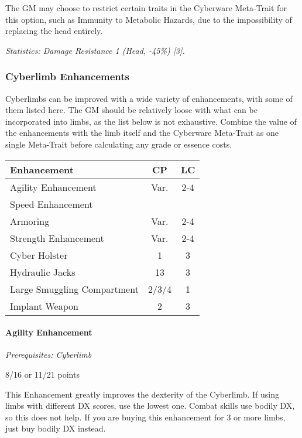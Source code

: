 \begin{multicols*}{3}
	The GM may choose to restrict certain traits in the Cyberware Meta-Trait for this option, such as Immunity to Metabolic Hazards, due to the impossibility of replacing the head entirely.
	
	\textit{\textcolor{OliveGreen}{Statistics: Damage Resistance 1 (Head, -45\%) [3].}}
	
		
	\subsubsection{Cyberlimb Enhancements}
	
	Cyberlimbs can be improved with a wide variety of enhancements, with some of them listed here. The GM should be relatively loose with what can be incorporated into limbs, as the list below is not exhaustive. Combine the value of the enhancements with the limb itself and the Cyberware Meta-Trait as one single Meta-Trait before calculating any grade or essence costs.
	
	\begin{center}
		\begin{tabularx}{0.33\textwidth}{|X|c|c|}
			\hline
			Enhancement & CP & LC\\
			\hline
			\hline
			Agility Enhancement & Var. & 2-4 \\
			Speed Enhancement & & \\
			Armoring & Var. & 2-4 \\
			Strength Enhancement & Var. & 2-4 \\
			Cyber Holster & 1 & 3 \\
			Hydraulic Jacks & 13 & 3 \\
			Large Smuggling Compartment & 2/3/4 & 1\\
			Implant Weapon & 2 & 3 \\
			\hline
		\end{tabularx}
	\end{center}
	
	\paragraph{Agility Enhancement}
	\textit{Prerequisites: Cyberlimb}
	\begin{flushright}
		8/16 or 11/21 points
	\end{flushright}
	
	This Enhancement greatly improves the dexterity of the Cyberlimb. If using limbs with different DX scores, use the lowest one. Combat skills use bodily DX, so this does not help. If you are buying this enhancement for 3 or more limbs, just buy bodily DX instead. 
	

\end{multicols*}
